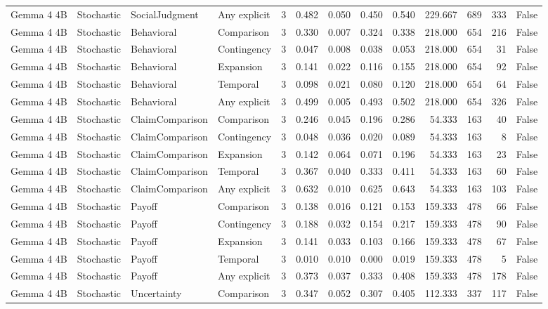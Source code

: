 \begin{tabular}{llllrrrrrrrrr}
Gemma 4 4B & Stochastic & SocialJudgment & Any explicit & 3 & 0.482 & 0.050 & 0.450 & 0.540 & 229.667 & 689 & 333 & False \\
Gemma 4 4B & Stochastic & Behavioral & Comparison & 3 & 0.330 & 0.007 & 0.324 & 0.338 & 218.000 & 654 & 216 & False \\
Gemma 4 4B & Stochastic & Behavioral & Contingency & 3 & 0.047 & 0.008 & 0.038 & 0.053 & 218.000 & 654 & 31 & False \\
Gemma 4 4B & Stochastic & Behavioral & Expansion & 3 & 0.141 & 0.022 & 0.116 & 0.155 & 218.000 & 654 & 92 & False \\
Gemma 4 4B & Stochastic & Behavioral & Temporal & 3 & 0.098 & 0.021 & 0.080 & 0.120 & 218.000 & 654 & 64 & False \\
Gemma 4 4B & Stochastic & Behavioral & Any explicit & 3 & 0.499 & 0.005 & 0.493 & 0.502 & 218.000 & 654 & 326 & False \\
Gemma 4 4B & Stochastic & ClaimComparison & Comparison & 3 & 0.246 & 0.045 & 0.196 & 0.286 & 54.333 & 163 & 40 & False \\
Gemma 4 4B & Stochastic & ClaimComparison & Contingency & 3 & 0.048 & 0.036 & 0.020 & 0.089 & 54.333 & 163 & 8 & False \\
Gemma 4 4B & Stochastic & ClaimComparison & Expansion & 3 & 0.142 & 0.064 & 0.071 & 0.196 & 54.333 & 163 & 23 & False \\
Gemma 4 4B & Stochastic & ClaimComparison & Temporal & 3 & 0.367 & 0.040 & 0.333 & 0.411 & 54.333 & 163 & 60 & False \\
Gemma 4 4B & Stochastic & ClaimComparison & Any explicit & 3 & 0.632 & 0.010 & 0.625 & 0.643 & 54.333 & 163 & 103 & False \\
Gemma 4 4B & Stochastic & Payoff & Comparison & 3 & 0.138 & 0.016 & 0.121 & 0.153 & 159.333 & 478 & 66 & False \\
Gemma 4 4B & Stochastic & Payoff & Contingency & 3 & 0.188 & 0.032 & 0.154 & 0.217 & 159.333 & 478 & 90 & False \\
Gemma 4 4B & Stochastic & Payoff & Expansion & 3 & 0.141 & 0.033 & 0.103 & 0.166 & 159.333 & 478 & 67 & False \\
Gemma 4 4B & Stochastic & Payoff & Temporal & 3 & 0.010 & 0.010 & 0.000 & 0.019 & 159.333 & 478 & 5 & False \\
Gemma 4 4B & Stochastic & Payoff & Any explicit & 3 & 0.373 & 0.037 & 0.333 & 0.408 & 159.333 & 478 & 178 & False \\
Gemma 4 4B & Stochastic & Uncertainty & Comparison & 3 & 0.347 & 0.052 & 0.307 & 0.405 & 112.333 & 337 & 117 & False \\

\end{tabular}
